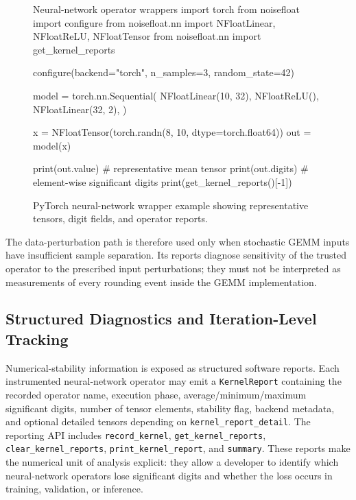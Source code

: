 \documentclass[manuscript, screen]{acmart}
\begin{document}
\begin{figure}[htp]
\centering
\begin{pythoncode}[label={lst:layers}]{Neural-network operator wrappers}
import torch
from noisefloat import configure
from noisefloat.nn import NFloatLinear, NFloatReLU, NFloatTensor
from noisefloat.nn import get_kernel_reports

configure(backend="torch", n_samples=3, random_state=42)

model = torch.nn.Sequential(
    NFloatLinear(10, 32),
    NFloatReLU(),
    NFloatLinear(32, 2),
)

x = NFloatTensor(torch.randn(8, 10, dtype=torch.float64))
out = model(x)

print(out.value)       # representative mean tensor
print(out.digits)      # element-wise significant digits
print(get_kernel_reports()[-1])
\end{pythoncode}
\caption{PyTorch neural-network wrapper example showing representative tensors, digit fields, and operator reports.}
\end{figure}

The data-perturbation path is therefore used only when stochastic GEMM inputs have insufficient sample separation. Its reports diagnose sensitivity of the trusted operator to the prescribed input perturbations; they must not be interpreted as measurements of every rounding event inside the GEMM implementation.


\subsection{Structured Diagnostics and Iteration-Level Tracking}

Numerical-stability information is exposed as structured software reports. Each instrumented neural-network operator may emit a \texttt{KernelReport} containing the recorded operator name, execution phase, average/minimum/maximum significant digits, number of tensor elements, stability flag, backend metadata, and optional detailed tensors depending on \texttt{kernel\_report\_detail}. The reporting API includes \texttt{record\_kernel}, \texttt{get\_kernel\_reports}, \texttt{clear\_kernel\_reports}, \texttt{print\_kernel\_report}, and \texttt{summary}. These reports make the numerical unit of analysis explicit: they allow a developer to identify which neural-network operators lose significant digits and whether the loss occurs in training, validation, or inference.
\end{document}
